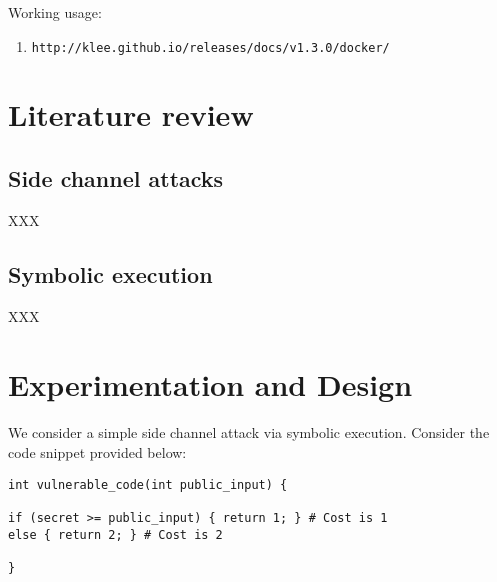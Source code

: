 \documentclass[11pt,a4paper,notitlepage]{article}
\begin{document}
Working usage:
\begin{enumerate}
    \item \texttt{http://klee.github.io/releases/docs/v1.3.0/docker/}
\end{enumerate}

\newpage

\section{Literature review}
\label{cha:literaturereview}


\subsection{Side channel attacks}
\label{sec:sidechannelattacks}

XXX 

\subsection{Symbolic execution}
\label{sec:symbolicexecution}

XXX

\newpage

\section{Experimentation and Design}

We consider a simple side channel attack via symbolic execution.
Consider the code snippet provided below:
\begin{verbatim}
int vulnerable_code(int public_input) {

if (secret >= public_input) { return 1; } # Cost is 1
else { return 2; } # Cost is 2

}
\end{verbatim}
\end{document}
